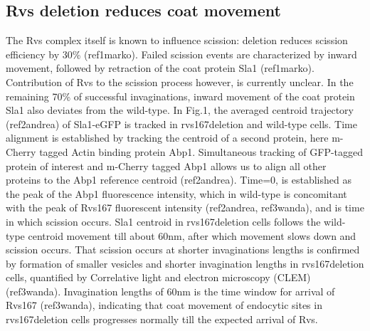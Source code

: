 \documentclass[9pt,lineno]{elife}
\begin{document}
\subsection{Rvs deletion reduces coat movement}
The Rvs complex itself is known to influence scission: deletion reduces scission efficiency by 30\% (ref1marko). Failed scission events are characterized by inward movement, followed by retraction of the coat protein Sla1 (ref1marko). Contribution of Rvs to the scission process however, is currently unclear. In the remaining 70\% of successful invaginations, inward movement of the coat protein Sla1 also deviates from the wild-type. In Fig.1, the averaged centroid trajectory (ref2andrea) of Sla1-eGFP is tracked in rvs167deletion and wild-type cells. Time alignment is established by tracking the centroid of a second protein, here m-Cherry tagged Actin binding protein Abp1. Simultaneous tracking of GFP-tagged protein of interest and m-Cherry tagged Abp1 allows us to align all other proteins to the Abp1 reference centroid (ref2andrea). Time=0, is established as the peak of the Abp1 fluorescence intensity, which in wild-type is concomitant with the peak of Rvs167 fluorescent intensity (ref2andrea, ref3wanda), and is time in which scission occurs. Sla1 centroid in rvs167deletion cells follows the wild-type centroid movement till about 60nm, after which movement slows down and scission occurs. That scission occurs at shorter invaginations lengths is confirmed by formation of smaller vesicles and shorter invagination lengths in rvs167deletion cells, quantified by Correlative light and electron microscopy (CLEM) (ref3wanda). Invagination lengths of 60nm is the time window for arrival of Rvs167 (ref3wanda), indicating that coat movement of endocytic sites in rvs167deletion cells progresses normally till the expected arrival of Rvs. 
\end{document}
